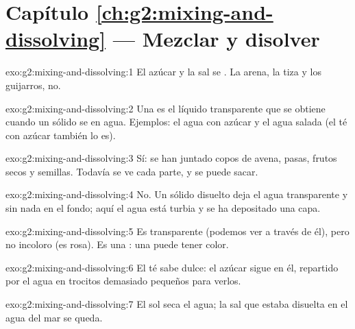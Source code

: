 \section*{Capítulo \ref{ch:g2:mixing-and-dissolving} --- Mezclar y disolver}

\begin{solution}{exo:g2:mixing-and-dissolving:1}
El azúcar y la sal se . La arena, la tiza y los guijarros, no.
\end{solution}

\begin{solution}{exo:g2:mixing-and-dissolving:2}
Una  es el líquido transparente que se obtiene cuando un
sólido se  en agua. Ejemplos: el agua con azúcar y el agua
salada (el té con azúcar también lo es).
\end{solution}

\begin{solution}{exo:g2:mixing-and-dissolving:3}
Sí: se han juntado copos de avena, pasas, frutos secos y semillas.
Todavía se ve cada parte, y se puede sacar.
\end{solution}

\begin{solution}{exo:g2:mixing-and-dissolving:4}
No. Un sólido disuelto deja el agua transparente y sin nada en el
fondo; aquí el agua está turbia y se ha depositado una capa.
\end{solution}

\begin{solution}{exo:g2:mixing-and-dissolving:5}
Es transparente (podemos ver a través de él), pero no incoloro (es
rosa). Es una : una  puede tener color.
\end{solution}

\begin{solution}{exo:g2:mixing-and-dissolving:6}
El té sabe dulce: el azúcar sigue en él, repartido por el agua en
trocitos demasiado pequeños para verlos.
\end{solution}

\begin{solution}{exo:g2:mixing-and-dissolving:7}
El sol seca el agua; la sal que estaba disuelta en el agua del mar se
queda.
\end{solution}

